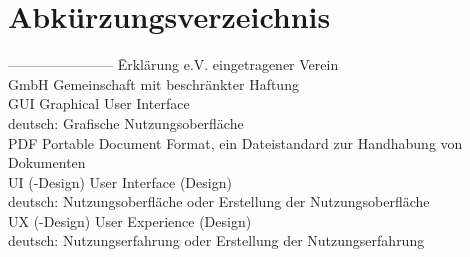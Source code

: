 \documentclass[a4paper]{scrartcl}
\begin{document}
\thispagestyle{empty}


\newpage


\setcounter{page}{2}

\tableofcontents



\newpage

\section*{Abkürzungsverzeichnis}


\begin{tabbing}
	----------------------- \= Erklärung \kill
	e.V. \> eingetragener Verein \\
	GmbH \> Gemeinschaft mit beschränkter Haftung \\
	GUI \> Graphical User Interface \\
	\> deutsch: Grafische Nutzungsoberfläche \\
	PDF \> Portable Document Format, ein Dateistandard zur Handhabung von \\ \> Dokumenten \\
	UI (-Design) \> User Interface (Design)  \\
	\> deutsch: Nutzungsoberfläche oder Erstellung der Nutzungsoberfläche \\
	UX (-Design) \> User Experience (Design) \\
	\> deutsch: Nutzungserfahrung oder Erstellung der Nutzungserfahrung \\ 
\end{tabbing}


\newpage

\listoffigures


\newpage

\listoftables


\newpage
\end{document}
